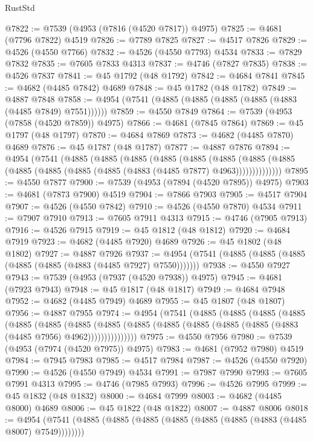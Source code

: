 \begin{lexlean}{RustStd}
\begin{coremodule}
@7822 := @7539 (@4953 (@7816 (@4520 @7817)) @4975)
@7825 := @4681 (@7796 @7822) @4519
@7826 := @7789 @7825
@7827 := @4517 @7826
@7829 := @4526 (@4550 @7766)
@7832 := @4526 (@4550 @7793) @4534
@7833 := @7829 @7832
@7835 := @7605 @7833 @4313
@7837 := @4746 (@7827 @7835)
@7838 := @4526 @7837
@7841 := @45 @1792 (@48 @1792)
@7842 := @4684 @7841
@7845 := @4682 (@4485 @7842) @4689
@7848 := @45 @1782 (@48 @1782)
@7849 := @4887 @7848
@7858 := @4954 (@7541 (@4885 (@4885 (@4885 (@4885 (@4883 (@4485 @7849) @7551))))))
@7859 := @4550 @7849
@7864 := @7539 (@4953 (@7858 (@4520 @7859)) @4975)
@7866 := @4681 (@7845 @7864)
@7869 := @45 @1797 (@48 @1797)
@7870 := @4684 @7869
@7873 := @4682 (@4485 @7870) @4689
@7876 := @45 @1787 (@48 @1787)
@7877 := @4887 @7876
@7894 := @4954
    (@7541
      (@4885
        (@4885
          (@4885
            (@4885
              (@4885
                (@4885
                  (@4885 (@4885 (@4885 (@4885 (@4885 (@4885 (@4883 (@4485 @7877) @4963))))))))))))))
@7895 := @4550 @7877
@7900 := @7539 (@4953 (@7894 (@4520 @7895)) @4975)
@7903 := @4681 (@7873 @7900) @4519
@7904 := @7866 @7903
@7905 := @4517 @7904
@7907 := @4526 (@4550 @7842)
@7910 := @4526 (@4550 @7870) @4534
@7911 := @7907 @7910
@7913 := @7605 @7911 @4313
@7915 := @4746 (@7905 @7913)
@7916 := @4526 @7915
@7919 := @45 @1812 (@48 @1812)
@7920 := @4684 @7919
@7923 := @4682 (@4485 @7920) @4689
@7926 := @45 @1802 (@48 @1802)
@7927 := @4887 @7926
@7937 := @4954 (@7541 (@4885 (@4885 (@4885 (@4885 (@4885 (@4883 (@4485 @7927) @7550)))))))
@7938 := @4550 @7927
@7943 := @7539 (@4953 (@7937 (@4520 @7938)) @4975)
@7945 := @4681 (@7923 @7943)
@7948 := @45 @1817 (@48 @1817)
@7949 := @4684 @7948
@7952 := @4682 (@4485 @7949) @4689
@7955 := @45 @1807 (@48 @1807)
@7956 := @4887 @7955
@7974 := @4954
    (@7541
      (@4885
        (@4885
          (@4885
            (@4885
              (@4885
                (@4885
                  (@4885
                    (@4885
                      (@4885 (@4885 (@4885 (@4885 (@4885 (@4883 (@4485 @7956) @4962)))))))))))))))
@7975 := @4550 @7956
@7980 := @7539 (@4953 (@7974 (@4520 @7975)) @4975)
@7983 := @4681 (@7952 @7980) @4519
@7984 := @7945 @7983
@7985 := @4517 @7984
@7987 := @4526 (@4550 @7920)
@7990 := @4526 (@4550 @7949) @4534
@7991 := @7987 @7990
@7993 := @7605 @7991 @4313
@7995 := @4746 (@7985 @7993)
@7996 := @4526 @7995
@7999 := @45 @1832 (@48 @1832)
@8000 := @4684 @7999
@8003 := @4682 (@4485 @8000) @4689
@8006 := @45 @1822 (@48 @1822)
@8007 := @4887 @8006
@8018 := @4954 (@7541 (@4885 (@4885 (@4885 (@4885 (@4885 (@4885 (@4883 (@4485 @8007) @7549))))))))

\end{coremodule}
\end{lexlean}
